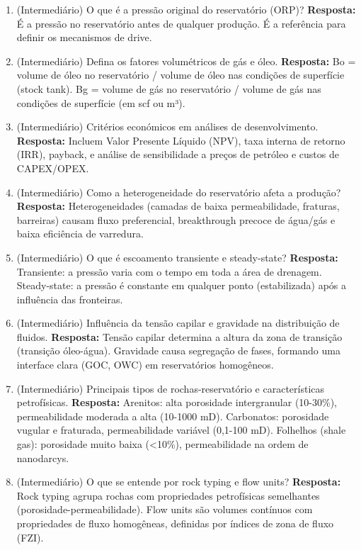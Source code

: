 \documentclass[11pt,a4paper]{article}
\begin{document}
\begin{enumerate}
  \item (Intermediário) O que é a pressão original do reservatório (ORP)?
  \textbf{Resposta:} É a pressão no reservatório antes de qualquer produção. É a referência para definir os mecanismos de drive.

  \item (Intermediário) Defina os fatores volumétricos de gás e óleo.
  \textbf{Resposta:} Bo = volume de óleo no reservatório / volume de óleo nas condições de superfície (stock tank). Bg = volume de gás no reservatório / volume de gás nas condições de superfície (em scf ou m³).

  \item (Intermediário) Critérios económicos em análises de desenvolvimento.
  \textbf{Resposta:} Incluem Valor Presente Líquido (NPV), taxa interna de retorno (IRR), payback, e análise de sensibilidade a preços de petróleo e custos de CAPEX/OPEX.

  \item (Intermediário) Como a heterogeneidade do reservatório afeta a produção?
  \textbf{Resposta:} Heterogeneidades (camadas de baixa permeabilidade, fraturas, barreiras) causam fluxo preferencial, breakthrough precoce de água/gás e baixa eficiência de varredura.

  \item (Intermediário) O que é escoamento transiente e steady-state?
  \textbf{Resposta:} Transiente: a pressão varia com o tempo em toda a área de drenagem. Steady-state: a pressão é constante em qualquer ponto (estabilizada) após a influência das fronteiras.

  \item (Intermediário) Influência da tensão capilar e gravidade na distribuição de fluidos.
  \textbf{Resposta:} Tensão capilar determina a altura da zona de transição (transição óleo-água). Gravidade causa segregação de fases, formando uma interface clara (GOC, OWC) em reservatórios homogêneos.

  \item (Intermediário) Principais tipos de rochas-reservatório e características petrofísicas.
  \textbf{Resposta:} Arenitos: alta porosidade intergranular (10-30\%), permeabilidade moderada a alta (10-1000 mD). Carbonatos: porosidade vugular e fraturada, permeabilidade variável (0,1-100 mD). Folhelhos (shale gas): porosidade muito baixa (<10\%), permeabilidade na ordem de nanodarcys.

  \item (Intermediário) O que se entende por rock typing e flow units?
  \textbf{Resposta:} Rock typing agrupa rochas com propriedades petrofísicas semelhantes (porosidade-permeabilidade). Flow units são volumes contínuos com propriedades de fluxo homogêneas, definidas por índices de zona de fluxo (FZI).


\end{enumerate}
\end{document}
